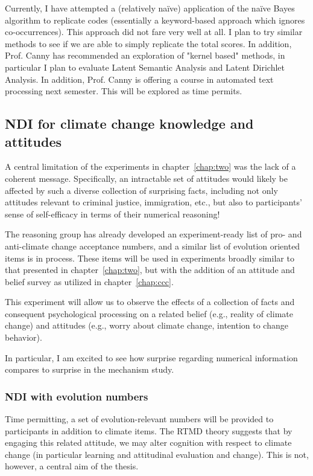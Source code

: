 Currently, I have attempted a (relatively na\"ive) application of the na\"ive
Bayes algorithm to replicate codes (essentially a keyword-based approach which
ignores co-occurrences). This approach did not fare very well at all. I plan to
try similar methods to see if we are able to simply replicate the total scores.
In addition, Prof. Canny has recommended an exploration of "kernel based"
methods, in particular I plan to evaluate Latent Semantic Analysis and Latent
Dirichlet Analysis. In addition, Prof. Canny is offering a course in automated
text processing next semester.  This will be explored as time permits.

\subsection{NDI for climate change knowledge and attitudes}

A central limitation of the experiments in chapter~\ref{chap:two} was the lack
of a coherent message. Specifically, an intractable set of attitudes
would likely be affected by such a diverse collection of surprising facts,
including not only attitudes relevant to criminal justice, immigration, etc.,
but also to participants' sense of self-efficacy in terms of their numerical
reasoning!

The reasoning group has already developed an experiment-ready list of pro- and
anti-climate change acceptance numbers, and a similar list of evolution oriented
items is in process. These items will be used in experiments broadly similar to
that presented in chapter~\ref{chap:two}, but with the addition of an attitude
and belief survey as utilized in chapter~\ref{chap:ccc}.

This experiment will allow us to observe the effects of a collection of facts
and consequent psychological processing on a related belief (e.g., reality of
climate change) and attitudes (e.g., worry about climate change, intention to
change behavior).

In particular, I am excited to see how surprise regarding numerical information
compares to surprise in the mechanism study.

\subsubsection{NDI with evolution numbers}

Time permitting, a set of evolution-relevant numbers will be provided to
participants in addition to climate items. The RTMD theory suggests that by
engaging this related attitude, we may alter cognition with respect to climate
change (in particular learning and attitudinal evaluation and change). This is
not, however, a central aim of the thesis.

